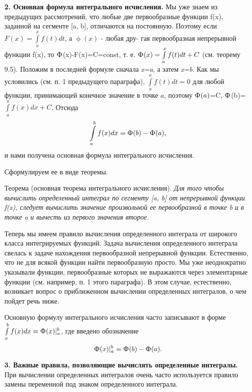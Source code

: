\documentclass[a4paper,12pt]{article}
\begin{document}
\textbf{2. Основная формула интегрального исчисления.} Мы уже знаем из предыдущих рассмотрений, что любые две первообразные функции f(x), заданной на сегменте [a, b], отличаются на постоянную. Поэтому если $F(x) = \int\limits_{a}^{x}f(t)dt$, а $\upphi(x)$ - любая дру-
\newpage
\thispagestyle{fancy}
\fancyhf{}
\noindent гая первообразная непрерывной функции f(x), то $\Upphi$(x)-F(x)=C=const, т. е. $\Upphi (x) = \int\limits_{a}^{x}f(t)dt+C$ (см. теорему 9.5). Положим в последней формуле сначала \textit{x=a}, а затем \textit{x=b}. Как мы условились (см. п. 1 предыдущего параграфа), $\int\limits_{a}^{a}f(t)dt=0$ для любой функции, принимающей конечное значение в точке $a$, поэтому $\Upphi(a)$=C, $\Upphi$(b)=$\int\limits_{a}^{a}f(x)dx+C$. Отсюда
\begin{equation*}
	\int\limits_{a}^{b}f(x)dx=\Upphi(b)-\Upphi(a),
\end{equation*}
и нами получена основная формула интегрального исчисления.

Сформулируем ее в виде теоремы.

Теорема (основная теорема интегрального исчисления). \textit{Для того чтобы вычислить определенный интеграл по сегменту [a, b] от непрерывной функции f(x), следует вычислить значение произвольной ее первообразной в точке b и в точке a и вычесть из первого значения второе.}

Теперь мы имеем правило вычисления определенного интеграла от широкого класса интегрируемых функций. Задача вычисления определенного интеграла свелась к задаче нахождения первообразной непрерывной функции. Естественно, что не для всякой функции найти первообразную просто. Мы уже неоднократно указывали функции, первообразные которых не выражаются через элементарные функции (см. например, п. 1 этого параграфа). В этом случае, естественно, возникает вопрос о приближенном вычислении определенных интегралов, о чем пойдет речь ниже.

Основную формулу интегрального исчисления часто записывают в форме $\int\limits_{a}^{b}f(x)dx=\Upphi(x)|_{a}^{b}$, где введено обозначение 
\begin{equation*}
	\Upphi(x)|_{a}^{b}=\Upphi(b)-\Upphi(a).
\end{equation*}

\textbf{3. Важные правила, позволяющие вычислять определенные интегралы.} При вычислении определенных интегралов очень часто используется правило замены переменной под знаком определенного интеграла.
\end{document}
